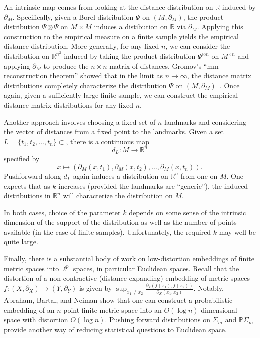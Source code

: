 \documentclass[a4paper,11pt]{article}
\begin{document}
An intrinsic map comes from looking at the distance distribution on $\mathbb{R}$ induced by $\partial_M$.
Specifically, given a Borel distribution $\Psi$ on $(M, \partial_M)$, the product distribution $\Psi \otimes \Psi$ on $M \times M$ induces a distibution on $\mathbb{R}$ via $\partial_M$.
Applying this construction to the empirical measure on a finite sample yields the empirical distance distribution.
More generally, for any fixed $n$, we can consider the distribution on $\mathbb{R}^{n^2}$ induced by taking the product distribution $\Psi^{\otimes n}$ on $M^{\times n}$ and applying $\partial_M$ to produce the $n \times n$ matrix of distances.
Gromov's ``mm-reconstruction theorem'' showed that in the limit as $n \to \infty$, the distance matrix distributions completely characterize the distribution $\Psi$ on $(M, \partial_M)$~\cite{gromov1981}.
Once again, given a sufficiently large finite sample, we can construct the empirical distance matrix distributions for any fixed $n$.

Another approach involves choosing a fixed set of $n$ landmarks and considering the vector of distances from a fixed point to the landmarks.
Given a set $L = \{t_1, t_2, \ldots, t_n\} \subset $, there is a continuous map
\[
d_L \colon M \to \mathbb{R}^n
\]
specified by
\[
x \mapsto (\partial_M(x,t_1), \partial_M(x,t_2), \ldots, \partial_M(x,t_n)).
\]
Pushforward along $d_L$ again induces a distribution on $\mathbb{R}^n$ from one on $M$.
One expects that as $k$ increases (provided the landmarks are ``generic''), the induced distributions in $\mathbb{R}^n$ will characterize the distribution on $M$.

In both cases, choice of the parameter $k$ depends on some sense of the intrinsic dimension of the support of the distribution as well as the number of points available (in the case of finite samples).
Unfortunately, the required $k$ may well be quite large.

Finally, there is a substantial body of work on low-distortion embeddings of finite metric spaces into $\ell^p$ spaces, in particular Euclidean spaces.
Recall that the distortion of a non-contractive (distance expanding) embedding of metric spaces $f \colon (X, \partial_X) \to (Y, \partial_Y)$ is given by $\sup_{x_1 \neq x_2} \frac{\partial_Y (f(x_1), f(x_2))}{\partial_X (x_1, x_2)}$.
Notably, Abraham, Bartal, and Neiman show that one can construct a probabilistic embedding of an $n$-point finite metric space into an $O(\log n)$ dimensional space with distortion $O(\log n)$.
Pushing forward distributions on $\Sigma_m$ and $\mathbb{P}\Sigma_m$ provide another way of reducing statistical questions to Euclidean space.
\end{document}
